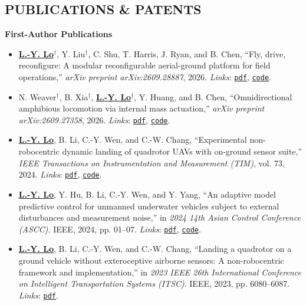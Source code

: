 \documentclass[overlapped]{res}
\newcommand{\pink}[1]{\textcolor{pink!40!red}{#1}} %
\begin{document}
\begin{resume}
\section{PUBLICATIONS \& PATENTS 
}
\textbf{First-Author Publications}
\begin{itemize}
  \item \underline{\textbf{L.-Y. Lo}}$^{\dagger}$, Y. Liu$^{\dagger}$, C. Shu, T. Harris, J. Ryan, and B. Chen, ``Fly, drive, reconfigure: A modular reconfigurable aerial-ground platform for field operations,'' \textit{arXiv preprint arXiv:2609.28887}, 2026. \textit{Links}: \pink{\texttt{\href{https://pattylo.github.io/pdfs/harp.pdf}{pdf}}}, \pink{\texttt{\href{https://github.com/generalroboticslab/HARP}{code}}}.
  \item N. Weaver$^{\dagger}$, B. Xia$^{\dagger}$, \underline{\textbf{L.-Y. Lo}}$^{\dagger}$, Y. Huang, and B. Chen, ``Omnidirectional amphibious locomotion via internal mass actuation,'' \textit{arXiv preprint arXiv:2609.27358}, 2026. \textit{Links}: \pink{\texttt{\href{https://pattylo.github.io/pdfs/ballbot.pdf}{pdf}}}, \pink{\texttt{\href{https://github.com/generalroboticslab/MARBLE}{code}}}.
  \item \underline{\textbf{L.-Y. Lo}}, B. Li, C.-Y. Wen, and C.-W. Chang, ``Experimental non-robocentric dynamic landing of quadrotor UAVs with on-ground sensor suite,'' \textit{IEEE Transactions on Instrumentation and Measurement (TIM)}, vol. 73, 2024. \textit{Links}: \pink{\texttt{\href{https://pattylo.github.io/pdfs/tim.pdf}{pdf}}}, \pink{\texttt{\href{https://github.com/HKPolyU-UAV/ALAN}{code}}}.
  \item \underline{\textbf{L.-Y. Lo}}, Y. Hu, B. Li, C.-Y. Wen, and Y. Yang, ``An adaptive model predictive control for unmanned underwater vehicles subject to external disturbances and measurement noise,'' in \textit{2024 14th Asian Control Conference (ASCC)}. IEEE, 2024, pp. 01–07. \textit{Links}: \pink{\texttt{\href{https://pattylo.github.io/pdfs/uuv.pdf}{pdf}}}, \pink{\texttt{\href{https://github.com/HKPolyU-UAV/bluerov2/tree/eskf_obs2}{code}}}.
  \item \underline{\textbf{L.-Y. Lo}}, B. Li, C.-Y. Wen, and C.-W. Chang, ``Landing a quadrotor on a ground vehicle without exteroceptive airborne sensors: A non-robocentric framework and implementation,'' in \textit{2023 IEEE 26th International Conference on Intelligent Transportation Systems (ITSC)}. IEEE, 2023, pp. 6080–6087. \textit{Links}: \pink{\texttt{\href{https://pattylo.github.io/pdfs/itsc.pdf}{pdf}}}.

\end{itemize}
\end{resume}
\end{document}
